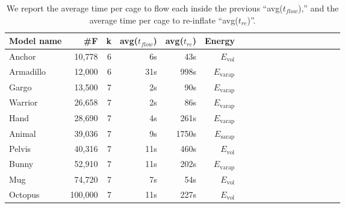 \begin{table}
\centering
{}
\setlength{\tabcolsep}{5.5pt}
\begin{tabular}{l r r r r r r r r r r r r r r r r r}
\rowcolor{white}
Model name  & \#F & k & avg($t_{flow}$) & avg($t_{re}$) & Energy\\
\midrule
Anchor & 10,778 & 6 & 6s & 43s & $E_\text{vol}$ \\
Armadillo & 12,000 & 6 & 31s & 998s & $E_\text{varap}$ \\
Gargo & 13,500 & 7 & 2s & 90s & $E_\text{varap}$\\
Warrior & 26,658 & 7 & 2s & 86s & $E_\text{varap}$  \\
Hand & 28,690 & 7 & 4s & 261s & $E_\text{varap}$  \\
Animal & 39,036 & 7 & 9s & 1750s & $E_\text{sarap}$ \\
Pelvis & 40,316 & 7 & 11s & 460s & $E_\text{vol}$  \\
Bunny & 52,910 & 7 & 11s & 202s & $E_\text{varap}$ \\
Mug & 74,720 & 7 & 7s & 54s & $E_\text{vol}$ \\
Octopus & 100,000 & 7 & 11s & 227s & $E_\text{vol}$ \\
\bottomrule
\end{tabular}
\caption{
We report the average time per cage to flow each inside the 
previous ``avg($t_{flow}$),'' and the average time per cage to re-inflate
``avg($t_{re}$)''.}
\label{tab:timings}
\end{table}
